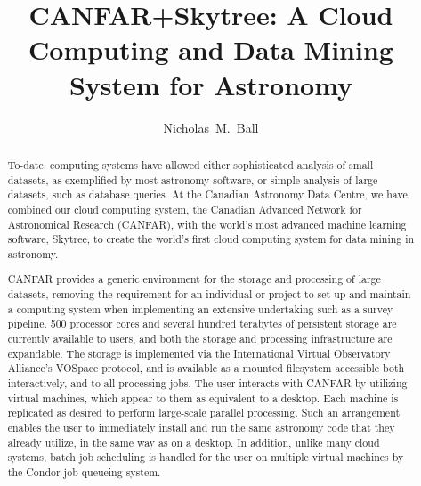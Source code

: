 
\resetcounters




\title{CANFAR+Skytree: A Cloud Computing and Data Mining System for Astronomy}
\author{Nicholas~M.~Ball
}


\begin{abstract}
To-date, computing systems have allowed either sophisticated analysis of small datasets, as exemplified by most astronomy software, or simple analysis of large datasets, such as database queries. At the Canadian Astronomy Data Centre, we have combined our cloud computing system, the Canadian Advanced Network for Astronomical Research (CANFAR), with the world's most advanced machine learning software, Skytree, to create the world's first cloud computing system for data mining in astronomy.

CANFAR provides a generic environment for the storage and processing of large datasets, removing the requirement for an individual or project to set up and maintain a computing system when implementing an extensive undertaking such as a survey pipeline. 500 processor cores and several hundred terabytes of persistent storage are currently available to users, and both the storage and processing infrastructure are expandable. The storage is implemented via the International Virtual Observatory Alliance's VOSpace protocol, and is available as a mounted filesystem accessible both interactively, and to all processing jobs. The user interacts with CANFAR by utilizing virtual machines, which appear to them as equivalent to a desktop. Each machine is replicated as desired to perform large-scale parallel processing. Such an arrangement enables the user to immediately install and run the same astronomy code that they already utilize, in the same way as on a desktop. In addition, unlike many cloud systems, batch job scheduling is handled for the user on multiple virtual machines by the Condor job queueing system.


\end{abstract}
